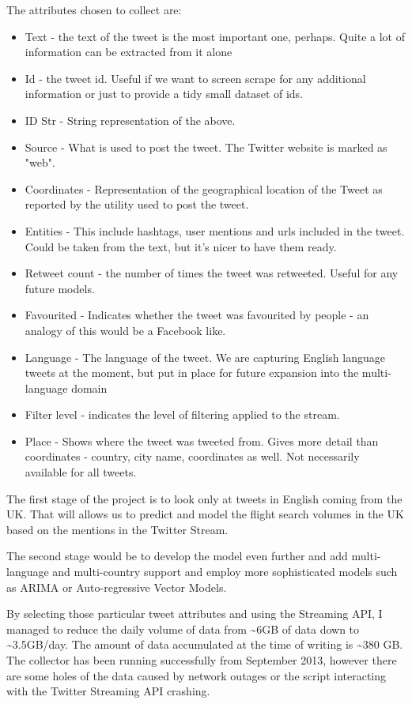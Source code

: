 \documentclass[minf,frontabs,twoside,singlespacing,parskip]{infthesis} %
\begin{document}
The attributes chosen to collect are:
\begin{itemize}
\item Text - the text of the tweet is the most important one, perhaps. Quite a lot of information can be extracted from it alone
\item Id - the tweet id. Useful if we want to screen scrape for any additional information or just to provide a tidy small dataset of ids.
\item ID Str - String representation of the above.
\item Source - What is used to post the tweet. The Twitter website is marked as "web".
\item Coordinates  - Representation of the geographical location of the Tweet as reported by the utility used to post the tweet.
\item Entities - This include hashtags, user mentions and urls included in the tweet. Could be taken from the text, but it's nicer to have them ready.
\item Retweet count - the number of times the tweet was retweeted. Useful for any future models. 
\item Favourited - Indicates whether the tweet was favourited by people - an analogy of this would be a Facebook like. 
\item Language - The language of the tweet. We are capturing English language tweets at the moment, but put in place for future expansion into the multi-language domain
\item Filter level - indicates the level of filtering applied to the stream.
\item Place - Shows where the tweet was tweeted from. Gives more detail than coordinates - country, city name, coordinates as well. Not necessarily available for all tweets.
\end{itemize}

The first stage of the project is to look only at tweets in English coming from the UK. That will allows us to predict and model the flight search volumes in the UK based on the mentions in the Twitter Stream.

The second stage would be to develop the model even further and add multi-language and multi-country support and employ more sophisticated models such as ARIMA or Auto-regressive Vector Models.

By selecting those particular tweet attributes and using the Streaming API, I managed to reduce the daily volume of data from \textasciitilde 6GB of data down to \textasciitilde 3.5GB/day.
The amount of data accumulated at the time of writing is \textasciitilde 380 GB. The collector has been running successfully from September 2013, however there are some holes of the data caused by network outages or the script interacting with the Twitter Streaming API crashing. 
\end{document}
